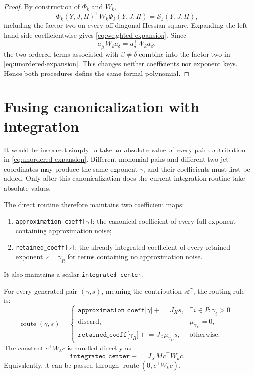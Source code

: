 \documentclass[11pt]{article}
\newcommand{\eps}{\varepsilon}
\begin{document}
\begin{proof}
By construction of \(\Phi_k\) and \(W_k\),
\[
    \Phi_k(Y,J,H)^\top W_k\Phi_k(Y,J,H)
    =
    \mathcal{S}_k(Y,J,H),
\]
including the factor two on every off-diagonal Hessian square.
Expanding the left-hand side coefficientwise gives
\eqref{eq:weighted-expansion}.  Since
\[
    a_\beta^\top W_ka_\delta
    =
    a_\delta^\top W_ka_\beta,
\]
the two ordered terms associated with \(\beta\neq\delta\) combine into the
factor two in \eqref{eq:unordered-expansion}.  This changes neither coefficients
nor exponent keys.  Hence both procedures define the same formal polynomial.
\end{proof}

\section{Fusing canonicalization with integration}
\label{sec:fused}

It would be incorrect simply to take an absolute value of every pair
contribution in \eqref{eq:unordered-expansion}.  Different monomial pairs and
different two-jet coordinates may produce the same exponent \(\gamma\), and
their coefficients must first be added.  Only after this canonicalization does
the current integration routine take absolute values.

The direct routine therefore maintains two coefficient maps:
\begin{enumerate}[label=\arabic*.]
    \item \texttt{approximation\_coeff[\(\gamma\)]}: the canonical coefficient of
    every full exponent containing approximation noise;
    \item \texttt{retained\_coeff[\(\nu\)]}: the already integrated
    coefficient of every retained exponent \(\nu=\gamma_R\) for terms
    containing no approximation noise.
\end{enumerate}
It also maintains a scalar \texttt{integrated\_center}.

For every generated pair \((\gamma,s)\), meaning the contribution
\(s\eps^\gamma\), the routing rule is:
\begin{equation}
\operatorname{route}(\gamma,s)
=
\begin{cases}
    \texttt{approximation\_coeff[\(\gamma\)]}
        \mathrel{+}= J_X s,
        &\exists i\in P:\gamma_i>0,\\[1mm]
    \text{discard},
        &\mu_{\gamma_D}=0,\\[1mm]
    \texttt{retained\_coeff[\(\gamma_R\)]}
        \mathrel{+}= J_X\mu_{\gamma_D}s,
        &\text{otherwise}.
\end{cases}
\label{eq:routing}
\end{equation}
The constant \(c^\top W_kc\) is handled directly as
\[
    \texttt{integrated\_center}
    \mathrel{+}=
    J_X M\,c^\top W_kc.
\]
Equivalently, it can be passed through
\(\operatorname{route}(0,c^\top W_kc)\).
\end{document}
